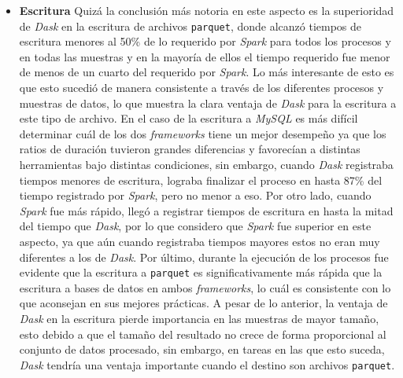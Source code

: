 \begin{itemize}
	\item \textbf{Escritura} Quizá la conclusión más notoria en este aspecto es la superioridad de \textit{Dask} en la escritura de archivos \texttt{parquet}, donde alcanzó tiempos de escritura menores al 50\% de lo requerido por \textit{Spark} para todos los procesos y en todas las muestras y en la mayoría de ellos el tiempo requerido fue menor de menos de un cuarto del requerido por \textit{Spark}. Lo más interesante de esto es que esto sucedió de manera consistente a través de los diferentes procesos y muestras de datos, lo que muestra la clara ventaja de \textit{Dask} para la escritura a este tipo de archivo. En el caso de la escritura a \textit{MySQL} es más difícil determinar cuál de los dos \textit{frameworks} tiene un mejor desempeño ya que los ratios de duración tuvieron grandes diferencias y favorecían a distintas herramientas bajo distintas condiciones, sin embargo, cuando \textit{Dask} registraba tiempos menores de escritura, lograba finalizar el proceso en hasta 87\% del tiempo registrado por \textit{Spark}, pero no menor a eso. Por otro lado, cuando \textit{Spark} fue más rápido, llegó a registrar tiempos de escritura en hasta la mitad del tiempo que \textit{Dask}, por lo que considero que \textit{Spark} fue superior en este aspecto, ya que aún cuando registraba tiempos mayores estos no eran muy diferentes a los de \textit{Dask}. Por último, durante la ejecución de los procesos fue evidente que la escritura a \texttt{parquet} es significativamente más rápida que la escritura a bases de datos en ambos \textit{frameworks}, lo cuál es consistente con lo que aconsejan en sus mejores prácticas. A pesar de lo anterior, la ventaja de \textit{Dask} en la escritura pierde importancia en las muestras de mayor tamaño, esto debido a que el tamaño del resultado no crece de forma proporcional al conjunto de datos procesado, sin embargo, en tareas en las que esto suceda, \textit{Dask} tendría una ventaja importante cuando el destino son archivos \texttt{parquet}.
		

\end{itemize}
